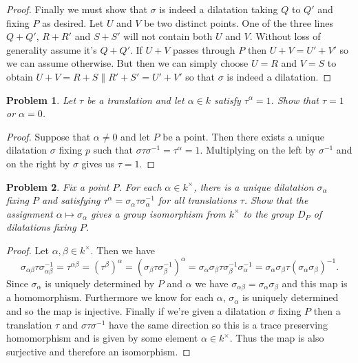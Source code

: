 \documentclass{article}
\newtheorem{problem}{Problem}
\begin{document}
\begin{proof}
Finally we must show that $\sigma$ is indeed a dilatation taking $Q$ to $Q'$ and fixing $P$ as desired. Let $U$ and $V$ be two distinct points. One of the three lines $Q + Q'$, $R + R'$ and $S + S'$ will not contain both $U$ and $V$. Without loss of generality assume it's $Q + Q'$. If $U + V$ passes through $P$ then $U+V = U' + V'$ so we can assume otherwise. But then we can simply choose $U = R$ and $V = S$ to obtain $U + V = R + S \parallel R' + S' = U' + V'$ so that $\sigma$ is indeed a dilatation.
\end{proof}

\begin{problem}
Let $\tau$ be a translation and let $\alpha \in k$ satisfy $\tau^{\alpha} = 1$. Show that $\tau = 1$ or $\alpha = 0$.
\end{problem}
\begin{proof}
Suppose that $\alpha \neq 0$ and let $P$ be a point. Then there exists a unique dilatation $\sigma$ fixing $p$ such that $\sigma \tau \sigma^{-1} = \tau^{\alpha} = 1$. Multiplying on the left by $\sigma^{-1}$ and on the right by $\sigma$ gives us $\tau = 1$.
\end{proof}

\begin{problem}
Fix a point $P$. For each $\alpha \in k^{\times}$, there is a unique dilatation $\sigma_{\alpha}$ fixing $P$ and satisfying $\tau^{\alpha} = \sigma_{\alpha} \tau \sigma_{\alpha}^{-1}$ for all translations $\tau$. Show that the assignment $\alpha \mapsto \sigma_{\alpha}$ gives a group isomorphism from $k^{\times}$ to the group $D_P$ of dilatations fixing $P$.
\end{problem}
\begin{proof}
Let $\alpha, \beta \in k^{\times}$. Then we have
\[
\sigma_{\alpha \beta} \tau \sigma_{\alpha \beta}^{-1} = \tau^{\alpha \beta} = (\tau^{\beta})^{\alpha} = (\sigma_{\beta} \tau \sigma_{\beta}^{-1})^{\alpha} = \sigma_{\alpha} \sigma_{\beta} \tau \sigma_{\beta}^{-1} \sigma_{\alpha}^{-1} = \sigma_{\alpha} \sigma_{\beta} \tau (\sigma_{\alpha} \sigma_{\beta})^{-1}.
\]
Since $\sigma_{\alpha}$ is uniquely determined by $P$ and $\alpha$ we have $\sigma_{\alpha \beta} = \sigma_{\alpha} \sigma_{\beta}$ and this map is a homomorphism. Furthermore we know for each $\alpha$, $\sigma_{\alpha}$ is uniquely determined and so the map is injective. Finally if we're given a dilatation $\sigma$ fixing $P$ then a translation $\tau$ and $\sigma \tau \sigma^{-1}$ have the same direction so this is a trace preserving homomorphism and is given by some element $\alpha \in k^{\times}$. Thus the map is also surjective and therefore an isomorphism.
\end{proof}
\end{document}

